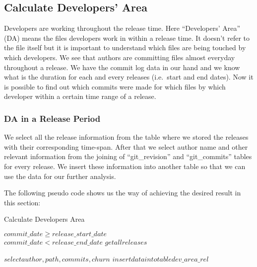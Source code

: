 \documentclass{acm_proc_article-sp}
\begin{document}
\subsection{Calculate Developers' Area}
Developers are working throughout the release time. Here ``Developers' Area'' (DA) means the files developers work in within a release time. It doesn't refer to the file itself but it is important to understand which files are being touched by which developers. We see that authors are committing files almost everyday throughout a release. We have the commit log data in our hand and we know what is the duration for each and every releases (i.e.\ start and end dates). Now it is possible to find out which commits were made for which files by which developer within a certain time range of a release.

\subsubsection{DA in a Release Period}
We select all the release information from the table where we stored the releases with their corresponding time-span. After that we select author name and other relevant information from the joining of ``git\_revision'' and ``git\_commits'' tables for every release. We insert these information into another table so that we can use the data for our further analysis.

The following pseudo code shows us the way of achieving the desired result in this section:

\begin{algorithm}
\caption{Calculate Developers Area}
\begin{algorithmic}
\REQUIRE $ $\\
$commit\_date \geq  release\_start\_date$\\
$commit\_date < release\_end\_date$
\ENSURE
\STATE $get all releases$

		\STATE $select author, path, commits, churn$
		\STATE $insert data into table dev\_area\_rel$
	\ENDIF
\ENDIF
\ENDWHILE
\end{algorithmic}
\end{algorithm}
\end{document}
